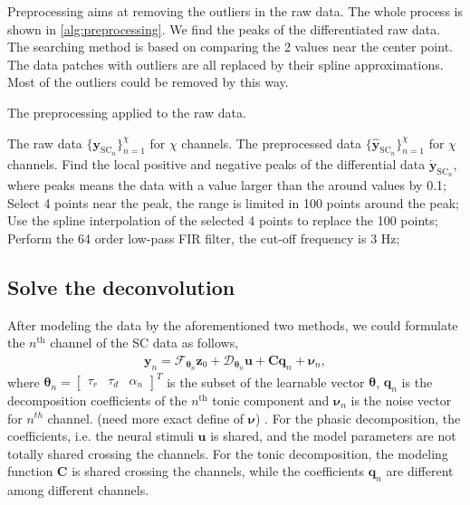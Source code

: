 \documentclass[]{article}
\begin{document}
Preprocessing aims at removing the outliers in the raw data. The whole process is shown in \autoref{alg:preprocessing}. We find the peaks of the differentiated raw data. The searching method is based on comparing the 2 values near the center point. The data patches with outliers are all replaced by their spline approximations. Most of the outliers could be removed by this way.
\begin{algorithm}[tb]
  \caption{The preprocessing applied to the raw data.}
  \label{alg:preprocessing}
  \begin{algorithmic}[1]
    \REQUIRE The raw data $\{\mathbf{y}_{\mathrm{SC}_n}\}_{n=1}^\chi$ for $\chi$ channels.
    \ENSURE The preprocessed data $\{\hat{\mathbf{y}}_{\mathrm{SC}_n}\}_{n=1}^\chi$ for $\chi$ channels.
      \STATE Find the local positive and negative peaks of the differential data $\dot{\mathbf{y}}_{\mathrm{SC}_n}$, where peaks means the data with a value larger than the around values by 0.1;
        \STATE Select 4 points near the peak, the range is limited in 100 points around the peak;
        \STATE Use the spline interpolation of the selected 4 points to replace the 100 points;
      \ENDFOR
      \STATE Perform the 64 order low-pass FIR filter, the cut-off frequency is 3 Hz;
    \ENDFOR
  \end{algorithmic}
\end{algorithm}

\subsection{Solve the deconvolution}

After modeling the data by the aforementioned two methods, we could formulate the $n^{\mathrm{th}}$ channel of the SC data as follows,
\begin{align}
  \mathbf{y}_n = \mathcal{F}_{\boldsymbol{\theta}_n} \mathbf{z}_{0} + \mathcal{D}_{\boldsymbol{\theta}_n} \mathbf{u} + \mathbf{C} \mathbf{q}_n + \boldsymbol{\nu}_n,
\end{align}
where $\boldsymbol{\theta}_n = \begin{bmatrix}
\tau_r & \tau_d & \alpha_n
\end{bmatrix}^T$ is the subset of the learnable vector $\boldsymbol{\theta}$, $\mathbf{q}_n$ is the decomposition coefficients of the $n^{\mathrm{th}}$ tonic component and $\boldsymbol{\nu}_n$ is the noise vector for $n^{th}$ channel. {\color{red} (need more exact define of $\boldsymbol{\nu}$) }. For the phasic decomposition, the coefficients, i.e. the neural stimuli $\mathbf{u}$ is shared, and the model parameters are not totally shared crossing the channels. For the tonic decomposition, the modeling function $\mathbf{C}$ is shared crossing the channels, while the coefficients $\mathbf{q}_n$ are different among different channels.
\end{document}
